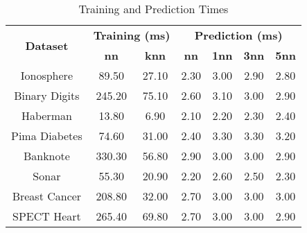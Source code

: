 \begin{table}[htbp]
\caption{Training and Prediction Times}
\begin{center}
\begin{tabular}{|c|c|c|c|c|c|c|}
\hline
\multirow{2}{*}{\textbf{Dataset}} & \multicolumn{2}{c|}{\textbf{Training (ms)}} & \multicolumn{4}{c|}{\textbf{Prediction (ms)}} \\ \cline{2-7}
 & \textbf{nn} & \textbf{knn} & \textbf{nn} & \textbf{1nn} & \textbf{3nn} & \textbf{5nn} \\ \hline
Ionosphere & 89.50 & 27.10 & 2.30 & 3.00 & 2.90 & 2.80 \\ \hline
Binary Digits & 245.20 & 75.10 & 2.60 & 3.10 & 3.00 & 2.90 \\ \hline
Haberman & 13.80 & 6.90 & 2.10 & 2.20 & 2.30 & 2.40 \\ \hline
Pima Diabetes & 74.60 & 31.00 & 2.40 & 3.30 & 3.30 & 3.20 \\ \hline
Banknote & 330.30 & 56.80 & 2.90 & 3.00 & 3.00 & 2.90 \\ \hline
Sonar & 55.30 & 20.90 & 2.20 & 2.60 & 2.50 & 2.30 \\ \hline
Breast Cancer & 208.80 & 32.00 & 2.70 & 3.00 & 3.00 & 3.00 \\ \hline
SPECT Heart & 265.40 & 69.80 & 2.70 & 3.00 & 3.00 & 2.90 \\ \hline
\end{tabular}
\label{tab:timing}
\end{center}
\end{table}